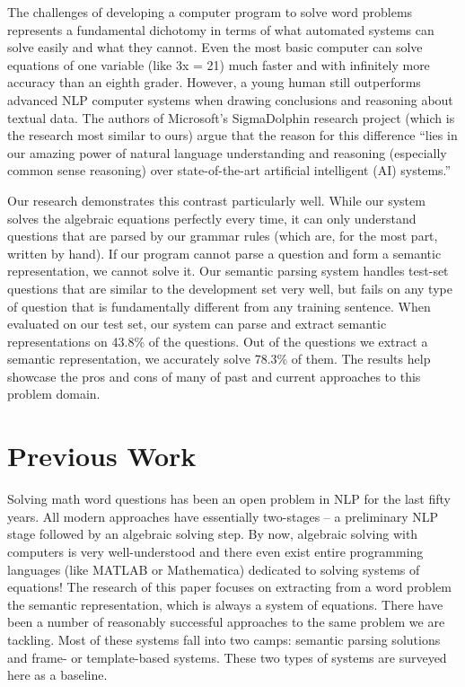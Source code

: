 \documentclass[11pt]{article}
\begin{document}
The challenges of developing a computer program to solve word problems represents a fundamental dichotomy in terms of what automated systems can solve easily and what they cannot. Even the most basic computer can solve equations of one variable (like 3x = 21) much faster and with infinitely more accuracy than an eighth grader. However, a young human still outperforms advanced NLP computer systems when drawing conclusions and reasoning about textual data. The authors of Microsoft’s SigmaDolphin research project (which is the research most similar to ours) argue that the reason for this difference ``lies in our amazing power of natural language understanding and reasoning (especially common sense reasoning) over state-of-the-art artificial intelligent (AI) systems.''

Our research demonstrates this contrast particularly well. While our system solves the algebraic equations perfectly every time, it can only understand questions that are parsed by our grammar rules (which are, for the most part, written by hand). If our program cannot parse a question and form a semantic representation, we cannot solve it. Our semantic parsing system handles test-set questions that are similar to the development set very well, but fails on any type of question that is fundamentally different from any training sentence. When evaluated on our test set, our system can parse and extract semantic representations on 43.8\% of the questions. Out of the questions we extract a semantic representation, we accurately solve 78.3\% of them. The results help showcase the pros and cons of many of past and current approaches to this problem domain.

\section{Previous Work}
Solving math word questions has been an open problem in NLP for the last fifty years. All modern approaches have essentially two-stages -- a preliminary NLP stage followed by an algebraic solving step. By now, algebraic solving with computers is very well-understood and there even exist entire programming languages (like MATLAB or Mathematica) dedicated to solving systems of equations! The research of this paper focuses on extracting from a word problem the semantic representation, which is always a system of equations. There have been a number of reasonably successful approaches to the same problem we are tackling. Most of these systems fall into two camps: semantic parsing solutions and frame- or template-based systems. These two types of systems are surveyed here as a baseline.
\end{document}
